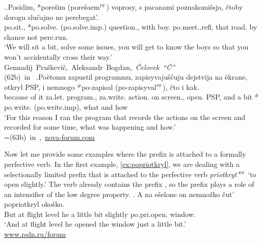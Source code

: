 \ex.\label{ex:po:Tat}\ag.\label{ex:po:Tat1}Posidim, *pore\v{s}im (\textsuperscript{\JudgeOK}pore\v{s}aem$^{\textsc{pf}}$) voprosy, s pacanami poznakomi\v{s}sja, \v{c}toby dorogu slu\v{c}ajno ne perebegat'.\\
po.sit., *po.solve. (\textsuperscript{\JudgeOK}po.solve.imp.) question., with boy. po.meet..refl, that road. {by chance} not pere.run.\\
\trans `We will sit a bit, solve some issues, you will get to know the boys so that you won't accidentally cross their way.'\\\hbox{}\hfill\hbox{Gennadij Pra\v{s}kevi\v{c}, Aleksandr Bogdan, \textit{\v{C}elovek ``\v{C}''}}\\\hbox{}\hfill\hbox{(62b) in \citet{Tatevosov:09}}
\bg.\label{ex:po:Tat2}Po\`{e}tomu zapustil programmu, zapisyvaju\v{s}\v{c}uju dejstvija na \`{e}krane, otkryl PSP, i nemnogo $^\#$po-zapisal (\textsuperscript{\JudgeOK}po-zapisyval$^{\textsc{pf}}$), \v{c}to i kak.\\
{because of it} za.let. program., za.write. action. on screen., open. PSP, and {a bit} $^\#$po.write. (\textsuperscript{\JudgeOK}po.write.imp), what and how\\
\trans `For this reason I ran the program that records the actions on the screen and recorded for some time, what was happening and how.'\\\hbox{}\hfill\hbox{=(63b) in \citet{Tatevosov:09}, \url{nova-forum.com}}

Now let me provide some examples where the  prefix  is attached to a formally perfective verb. In the first example, \ref{ex:popriotkryl}, we are dealing with a selectionally limited prefix  that is attached to the perfective verb \textit{priotkryt'}$^{\textsc{pf}}$ `to open slightly.' The  verb already contains the  prefix , so the  prefix  plays a role of an intensifier of the low degree property. 
\exg. \label{ex:popriotkryl}A na e\v{s}elone on nemno\v{z}ko \v{c}ut' popriotkryl oko\v{s}ko.\\
But at {flight level} he {a little bit} {slightly} po.pri.open. window.\\
\trans `And at flight level he opened the window just a little bit.'\\\hbox{}\hfill\hbox{\url{www.rsdn.ru/forum}}

